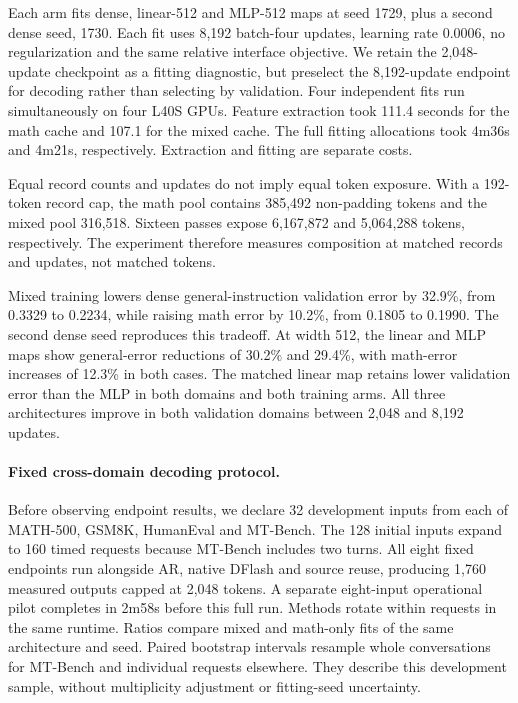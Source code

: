 \documentclass{article}
\begin{document}
Each arm fits dense, linear-512 and MLP-512 maps at seed 1729, plus a
second dense seed, 1730. Each fit uses 8,192 batch-four updates, learning
rate 0.0006, no regularization and the same relative interface objective.
We retain the 2,048-update checkpoint as a fitting diagnostic, but
preselect the 8,192-update endpoint for decoding rather than selecting
by validation. Four independent fits run simultaneously on four L40S
GPUs. Feature extraction took 111.4 seconds for the math cache and
107.1 for the mixed cache. The full fitting allocations took 4m36s and
4m21s, respectively. Extraction and fitting are separate costs.

Equal record counts and updates do not imply equal token exposure.
With a 192-token record cap, the math pool contains 385,492 non-padding
tokens and the mixed pool 316,518. Sixteen passes expose 6,167,872 and
5,064,288 tokens, respectively. The experiment therefore measures
composition at matched records and updates, not matched tokens.

\begin{table}[H]
\caption{Composition fitting at the preselected 8,192-update endpoint.
Validation columns use the same held-out features in both arms.
Reported seconds cover per-worker data access, updates and training-log
writes, excluding validation, export and setup. Training losses concern
different input distributions and are not directly comparable across arms.}
\label{tab:composition-fitting}
\centering\small

\end{table}

Mixed training lowers dense general-instruction validation error by
32.9\%, from 0.3329 to 0.2234, while raising math error by 10.2\%,
from 0.1805 to 0.1990. The second dense seed reproduces this tradeoff.
At width 512, the linear and MLP maps show general-error reductions of
30.2\% and 29.4\%, with math-error increases of 12.3\% in both cases.
The matched linear map retains lower validation error than the MLP
in both domains and both training arms. All three architectures improve
in both validation domains between 2,048 and 8,192 updates.

\paragraph{Fixed cross-domain decoding protocol.}
Before observing endpoint results, we declare 32 development inputs from
each of MATH-500, GSM8K, HumanEval and MT-Bench. The 128 initial inputs
expand to 160 timed requests because MT-Bench includes two turns.
All eight fixed endpoints run alongside AR, native DFlash and source
reuse, producing 1,760 measured outputs capped at 2,048 tokens. A separate
eight-input operational pilot completes in 2m58s before this full run.
Methods rotate within requests in the same runtime. Ratios compare
mixed and math-only fits of the same architecture and seed. Paired
bootstrap intervals resample whole conversations for MT-Bench and
individual requests elsewhere. They describe this development sample,
without multiplicity adjustment or fitting-seed uncertainty.
\end{document}
